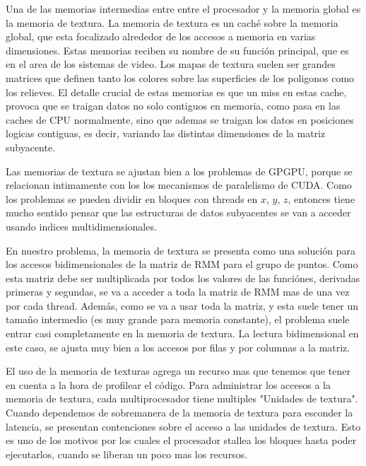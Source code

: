 Una de las memorias intermedias entre entre el procesador y la memoria global es
la memoria de textura. La memoria de textura es un cach\'e sobre la memoria global,
que esta focalizado alrededor de los accesos a memoria en varias dimensiones.
Estas memorias reciben su nombre de su funci\'on principal, que es en el area de los
sistemas de video. Los mapas de textura suelen ser grandes matrices que definen
tanto los colores sobre las superficies de los poligonos como los relieves.
El detalle crucial de estas memorias es que un miss en estas cache, provoca
que se traigan datos no solo contiguos en memoria, como pasa en las caches de
CPU normalmente, sino que ademas se traigan los datos en posiciones logicas contiguas,
es decir, variando las distintas dimensiones de la matriz subyacente.

Las memorias de textura se ajustan bien a los problemas de GPGPU, porque se relacionan
intimamente con los los mecanismos de paralelismo de CUDA. Como los problemas se pueden
dividir en bloques con threads en $x$, $y$, $z$, entonces tiene mucho sentido pensar
que las estructuras de datos subyacentes se van a acceder usando indices multidimensionales.

En nuestro problema, la memoria de textura se presenta como una soluci\'on para
los accesos bidimensionales de la matriz de RMM para el grupo de puntos.
Como esta matriz debe ser multiplicada por todos los valores de las funci\'ones,
derivadas primeras y segundas, se va a acceder a toda la matriz de RMM mas de
una vez por cada thread. Adem\'as, como se va a usar toda la matriz, y esta suele
tener un tamaño intermedio (es muy grande para memoria constante), el problema
suele entrar casi completamente en la memoria de textura.
La lectura bidimensional en este caso, se ajusta muy bien a los accesos por filas
y por columnas a la matriz.

El uso de la memoria de texturas agrega un recurso mas que tenemos que tener en
cuenta a la hora de profilear el c\'odigo. Para administrar los accesos a
la memoria de textura, cada multiprocesador tiene multiples "Unidades de textura".
Cuando dependemos de sobremanera de la memoria de textura para esconder la latencia,
se presentan contenciones sobre el acceso a las unidades de textura. Esto es
uno de los motivos por los cuales el procesador stallea los bloques hasta poder
ejecutarlos, cuando se liberan un poco mas los recursos.


